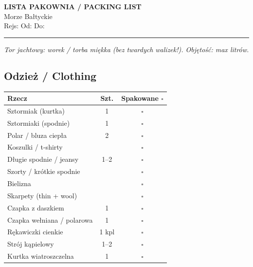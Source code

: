 \documentclass[a4paper,11pt]{article}
\begin{document}

\begin{center}
    {\Large\bfseries\color{pzzblue} LISTA PAKOWNIA / PACKING LIST}\\
    {\large Morze Bałtyckie}\\[4pt]
    {\small Rejs: \field{5cm} \quad Od: \field{3cm} \quad Do: \field{3cm}}
\end{center}

\vspace{0.3cm}
\noindent\rule{\linewidth}{1pt}

\noindent\textit{Tor jachtowy: worek / torba miękka (bez twardych walizek!). Objętość: max \field{2cm} litrów.}

\vspace{0.2cm}

\subsection*{Odzież / Clothing}
\begin{tabularx}{\linewidth}{|X|c|c|}
\hline
\textbf{Rzecz} & \textbf{Szt.} & \textbf{Spakowane \(\square\)} \\
\hline
Sztormiak (kurtka) & 1 & \(\square\) \\[4pt]\hline
Sztormiaki (spodnie) & 1 & \(\square\) \\[4pt]\hline
Polar / bluza ciepła & 2 & \(\square\) \\[4pt]\hline
Koszulki / t-shirty & & \(\square\) \\[4pt]\hline
Długie spodnie / jeansy & 1--2 & \(\square\) \\[4pt]\hline
Szorty / krótkie spodnie & & \(\square\) \\[4pt]\hline
Bielizna & & \(\square\) \\[4pt]\hline
Skarpety (thin + wool) & & \(\square\) \\[4pt]\hline
Czapka z daszkiem & 1 & \(\square\) \\[4pt]\hline
Czapka wełniana / polarowa & 1 & \(\square\) \\[4pt]\hline
Rękawiczki cienkie & 1 kpl & \(\square\) \\[4pt]\hline
Strój kąpielowy & 1--2 & \(\square\) \\[4pt]\hline
Kurtka wiatroszczelna & 1 & \(\square\) \\[4pt]\hline
\end{tabularx}

\vspace{0.3cm}
\end{document}
